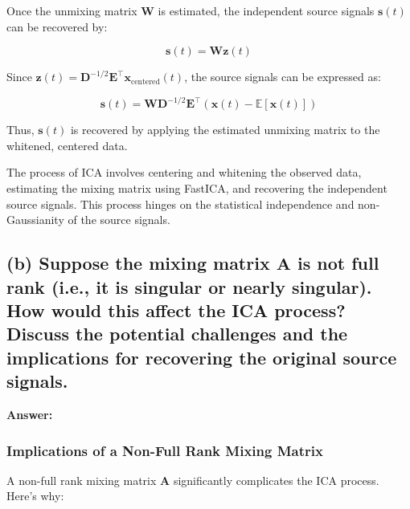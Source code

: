 \documentclass{exam}
\begin{document}
Once the unmixing matrix \( \mathbf{W} \) is estimated, the independent source signals \( \mathbf{s}(t) \) can be recovered by:

\[
\mathbf{s}(t) = \mathbf{W} \mathbf{z}(t)
\]

Since \( \mathbf{z}(t) = \mathbf{D}^{-1/2} \mathbf{E}^\top \mathbf{x}_{\text{centered}}(t) \), the source signals can be expressed as:

\[
\mathbf{s}(t) = \mathbf{W} \mathbf{D}^{-1/2} \mathbf{E}^\top \left(\mathbf{x}(t) - \mathbb{E}[\mathbf{x}(t)]\right)
\]

Thus, \( \mathbf{s}(t) \) is recovered by applying the estimated unmixing matrix to the whitened, centered data.

The process of ICA involves centering and whitening the observed data, estimating the mixing matrix using FastICA, and recovering the independent source signals. This process hinges on the statistical independence and non-Gaussianity of the source signals.

\subsection{(b) Suppose the mixing matrix \texorpdfstring{$\mathbf{A}$}{A} is not full rank (i.e., it is singular or nearly singular). How would this affect the ICA process? Discuss the potential challenges and the implications for recovering the original source signals.}

\textbf{Answer:}

\subsubsection{Implications of a Non-Full Rank Mixing Matrix}

A non-full rank mixing matrix \( \mathbf{A} \) significantly complicates the ICA process. Here’s why:
\end{document}
